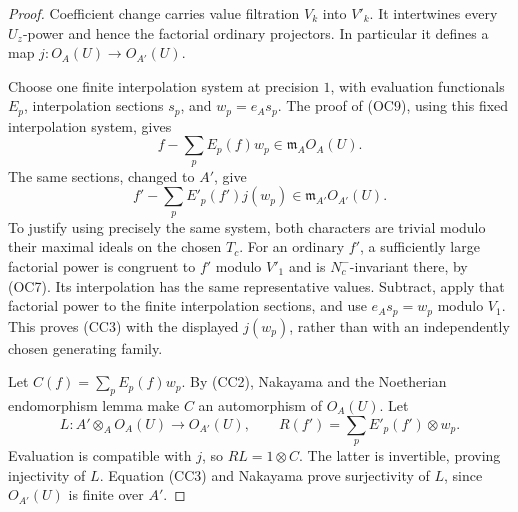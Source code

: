 \begin{proof}
Coefficient change carries value filtration \(V_k\) into \(V'_k\).
It intertwines every \(U_z\)-power and hence the factorial ordinary
projectors.  In particular it defines a map \(j:O_A(U)\to O_{A'}(U)\).

Choose one finite interpolation system at precision \(1\), with
evaluation functionals \(E_p\), interpolation sections \(s_p\), and
\(w_p=e_As_p\).  The proof of (OC9), using this fixed interpolation
system, gives
\[
 f-\sum_pE_p(f)w_p\in\mathfrak m_AO_A(U).
 \tag{CC2}
\]
The same sections, changed to \(A'\), give
\[
 f'-\sum_pE'_p(f')j(w_p)\in\mathfrak m_{A'}O_{A'}(U).
 \tag{CC3}
\]
To justify using precisely the same system, both characters are
trivial modulo their maximal ideals on the chosen \(T_c\).
For an ordinary \(f'\), a sufficiently large factorial power is
congruent to \(f'\) modulo \(V'_1\) and is \(N^-_c\)-invariant there,
by (OC7).  Its interpolation has the same representative values.
Subtract, apply that factorial power to the finite interpolation
sections, and use \(e_As_p=w_p\) modulo \(V_1\).
This proves (CC3) with the displayed \(j(w_p)\), rather than with an
independently chosen generating family.

Let \(C(f)=\sum_pE_p(f)w_p\).  By (CC2), Nakayama and the Noetherian
endomorphism lemma make \(C\) an automorphism of \(O_A(U)\).
Let
\[
 L:A'\otimes_AO_A(U)\to O_{A'}(U),\qquad
 R(f')=\sum_pE'_p(f')\otimes w_p.
\]
Evaluation is compatible with \(j\), so
\(RL=1\otimes C\).
The latter is invertible, proving injectivity of \(L\).
Equation (CC3) and Nakayama prove surjectivity of \(L\), since
\(O_{A'}(U)\) is finite over \(A'\).
\end{proof}

